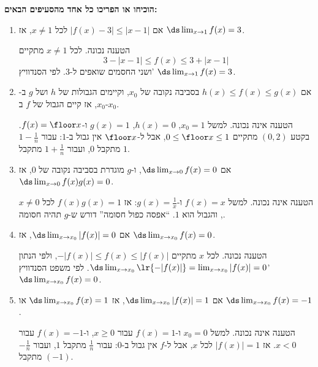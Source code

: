 \textbf{הוכיחו או הפריכו כל אחד מהסעיפים הבאים:}
\begin{enumerate}
\item אם $|f(x)-3|\le|x-1|$ לכל $x\ne1$, אז $\ds\lim_{x\to1}f(x)=3$.
\ifsol
\begin{solbox}
הטענה נכונה. לכל $x\ne1$ מתקיים
\[3-|x-1|\le f(x)\le3+|x-1|\]
ושני החסמים שואפים ל-$3$. לפי הסנדוויץ' $\ds\lim_{x\to1}f(x)=3$.
\end{solbox}
\fi
\item אם $h(x)\le f(x)\le g(x)$ בסביבה נקובה של $x_0$, וקיימים הגבולות של $h$ ושל $g$ ב-$x_0$, אז קיים הגבול של $f$ ב-$x_0$.
\ifsol
\begin{solbox}
הטענה אינה נכונה. למשל $x_0=1$, $h(x)=0$, $g(x)=1$ ו-$f(x)=\floor x$. בקטע $(0,2)$ מתקיים $0\le\floor x\le1$, אבל ל-$\floor x$ אין גבול ב-$1$: עבור $1-\frac1n$ מתקבל $0$, ועבור $1+\frac1n$ מתקבל $1$.
\end{solbox}
\fi
\item אם $\ds\lim_{x\to0}f(x)=0$, ו-$g$ מוגדרת בסביבה נקובה של $0$, אז $\ds\lim_{x\to0}f(x)g(x)=0$.
\ifsol
\begin{solbox}
הטענה אינה נכונה. למשל $f(x)=x$ ו-$g(x)=\frac1x$: אז $f(x)g(x)=1$ לכל $x\ne0$, והגבול הוא $1$. ``אפסה כפול חסומה'' דורש ש-$g$ תהיה חסומה.
\end{solbox}
\fi
\item אם $\ds\lim_{x\to x_0}|f(x)|=0$, אז $\ds\lim_{x\to x_0}f(x)=0$.
\ifsol
\begin{solbox}
הטענה נכונה. לכל $x$ מתקיים $-|f(x)|\le f(x)\le|f(x)|$, ולפי הנתון $\ds\lim_{x\to x_0}\lr{-|f(x)|}=\lim_{x\to x_0}|f(x)|=0$. לפי משפט הסנדוויץ' $\ds\lim_{x\to x_0}f(x)=0$.
\end{solbox}
\fi
\item אם $\ds\lim_{x\to x_0}|f(x)|=1$, אז $\ds\lim_{x\to x_0}f(x)=1$ או $\ds\lim_{x\to x_0}f(x)=-1$.
\ifsol
\begin{solbox}
הטענה אינה נכונה. למשל $x_0=0$ ו-$f(x)=1$ עבור $x\ge0$, ו-$f(x)=-1$ עבור $x<0$. אז $|f(x)|=1$ לכל $x$, אבל ל-$f$ אין גבול ב-$0$: עבור $\frac1n$ מתקבל $1$, ועבור $-\frac1n$ מתקבל $(-1)$.
\end{solbox}
\fi
\end{enumerate}
